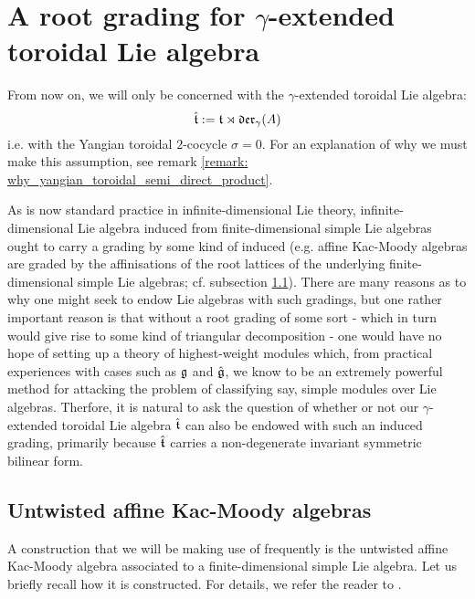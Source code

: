 \section{A root grading for \texorpdfstring{$\gamma$}{}-extended toroidal Lie algebra} \label{section: root_grading_for_yangian_EALAs}
    From now on, we will only be concerned with the $\gamma$-extended toroidal Lie algebra:
        $$\hat{\mathfrak{t}} := \mathfrak{t} \rtimes \mathfrak{der}_{\gamma}(A)$$
    i.e. with the Yangian toroidal $2$-cocycle $\sigma = 0$. For an explanation of why we must make this assumption, see remark \ref{remark: why_yangian_toroidal_semi_direct_product}.

    As is now standard practice in infinite-dimensional Lie theory, infinite-dimensional Lie algebra induced from finite-dimensional simple Lie algebras ought to carry a grading by some kind of induced  (e.g. affine Kac-Moody algebras are graded by the affinisations of the root lattices of the underlying finite-dimensional simple Lie algebras; cf. subsection \ref{subsection: a_fixed_untwisted_affine_kac_moody_algebra}). There are many reasons as to why one might seek to endow Lie algebras with such gradings, but one rather important reason is that without a root grading of some sort - which in turn would give rise to some kind of triangular decomposition - one would have no hope of setting up a theory of highest-weight modules which, from practical experiences with cases such as $\mathfrak{g}$ and $\hat{\mathfrak{g}}$, we know to be an extremely powerful method for attacking the problem of classifying say, simple modules over Lie algebras. Therfore, it is natural to ask the question of whether or not our $\gamma$-extended toroidal Lie algebra $\hat{\mathfrak{t}}$ can also be endowed with such an induced grading, primarily because $\hat{\mathfrak{t}}$ carries a non-degenerate invariant symmetric bilinear form.

    \subsection{Untwisted affine Kac-Moody algebras} \label{subsection: a_fixed_untwisted_affine_kac_moody_algebra}
        A construction that we will be making use of frequently is the untwisted affine Kac-Moody algebra associated to a finite-dimensional simple Lie algebra. Let us briefly recall how it is constructed. For details, we refer the reader to \cite[Chapters 6 and 7]{kac_infinite_dimensional_lie_algebras}.

